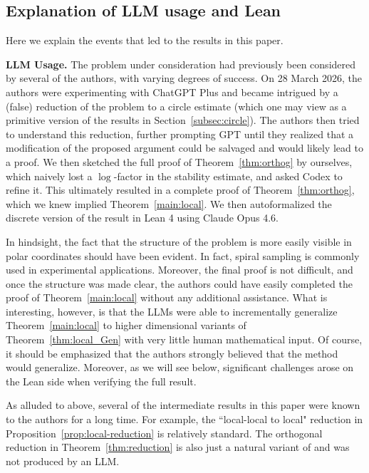 \documentclass[11pt]{amsart}
\theoremstyle{remark}
\begin{document}
\subsection{Explanation of LLM usage and Lean}\label{LLM Sect}
Here we explain the events that led to the results in this paper.
\medskip

\textbf{LLM Usage.} The problem under consideration had previously been considered by several of the authors, with varying degrees of success. On 28 March 2026, the authors were experimenting with ChatGPT Plus and became intrigued by a (false) reduction of the problem to a circle estimate (which one may view as a primitive version of the results in Section~\ref{subsec:circle}). The authors then tried to understand this reduction, further prompting GPT until they realized that a modification of the proposed argument could be salvaged and would likely lead to a proof. We then sketched the full proof of Theorem~\ref{thm:orthog} by ourselves, which naively lost a $\log$-factor in the stability estimate, and asked Codex to refine it. This ultimately resulted in a complete proof of Theorem~\ref{thm:orthog}, which we knew implied Theorem~\ref{main:local}. We then autoformalized the discrete version of the result in Lean 4 using Claude Opus 4.6. 
\medskip


In hindsight, the fact that the structure of the problem is more easily visible in polar coordinates should have been evident. In fact, spiral sampling is commonly used in experimental applications. Moreover, the final proof is not difficult, and once the structure was made clear, the authors could have easily completed the proof of  Theorem~\ref{main:local}  without any additional assistance. What is interesting, however, is that the LLMs were able to incrementally generalize Theorem~\ref{main:local} to higher dimensional variants of Theorem~\ref{thm:local_Gen} with very little human mathematical input. Of course, it should be emphasized that the authors strongly believed that the method would generalize. Moreover, as we will see below, significant challenges arose on the Lean side when verifying the full result.
\medskip

As alluded to above, several of the intermediate results in this paper were known to the authors for a long time. For example, the ``local-local to local" reduction in Proposition~\ref{prop:local-reduction} is relatively standard. The orthogonal reduction in Theorem~\ref{thm:reduction}  is also just a natural variant of \cite[Theorem 3.10]{MR4800909} and was not produced by an LLM.
\medskip
\end{document}
